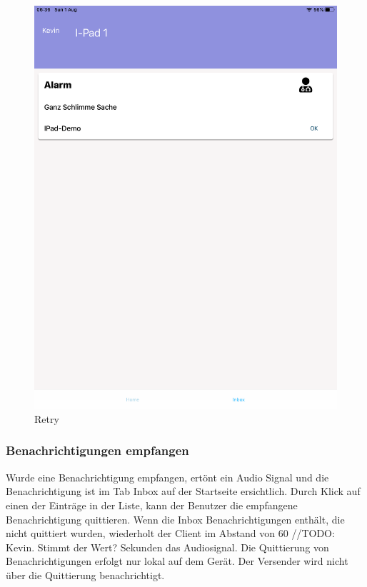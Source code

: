 \begin{figure}[h]
\begin{minipage}[b]{0.4\textwidth}
        \includegraphics[width=\textwidth]{graphics/screenshots/mobileclient/screenshots-inbox}
        \caption{Retry}
    \end{minipage}
    \label{fig:MobileClient-Screens2}
\end{figure}

\clearpage

\subsubsection*{Benachrichtigungen empfangen}

Wurde eine Benachrichtigung empfangen, ertönt ein Audio Signal und die Benachrichtigung ist im Tab Inbox auf der Startseite ersichtlich.
Durch Klick auf einen der Einträge in der Liste, kann der Benutzer die empfangene Benachrichtigung quittieren.
Wenn die Inbox Benachrichtigungen enthält, die nicht quittiert wurden, wiederholt der Client im Abstand von 60 //TODO: Kevin. Stimmt der Wert? Sekunden das Audiosignal.
Die Quittierung von Benachrichtigungen erfolgt nur lokal auf dem Gerät.
Der Versender wird nicht über die Quittierung benachrichtigt.

